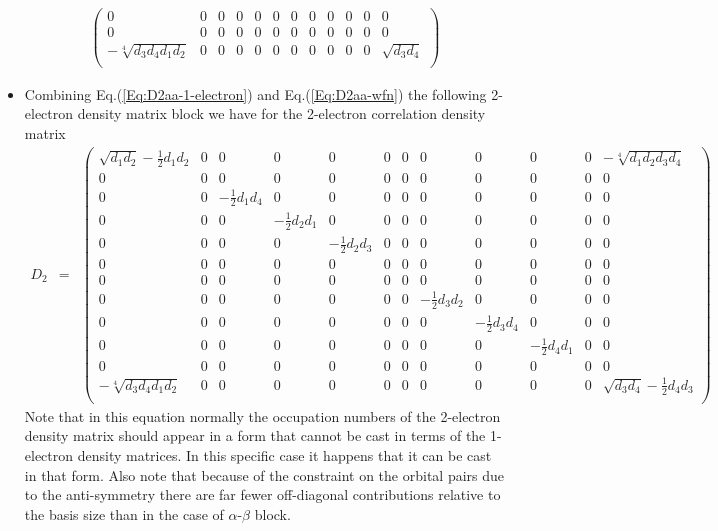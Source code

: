 \documentclass{amsart}
\begin{document}
\begin{itemize}
\begin{eqnarray}
\begin{pmatrix}
         0 & 0 & 0 & 0 & 0 & 0 & 0 & 0 & 0 & 0 & 0 & 0 \\
         0 & 0 & 0 & 0 & 0 & 0 & 0 & 0 & 0 & 0 & 0 & 0 \\
         -\sqrt[4]{d_{3}d_{4}d_{1}d_{2}} & 0 & 0 & 0 & 0 & 0 & 0 & 0 & 0 & 0 & 0 & \sqrt{d_{3}d_{4}} \\
         \end{pmatrix} 
         \end{eqnarray}
\item Combining Eq.(\ref{Eq:D2aa-1-electron}) and Eq.(\ref{Eq:D2aa-wfn}) the following 2-electron
         density matrix block we have for the 2-electron correlation density matrix
         \tiny
         \begin{eqnarray}
         \label{Eq:D2aa-correlation}
         D_2 &=&
         \begin{pmatrix}
         \sqrt{d_{1}d_{2}}-\frac{1}{2}d_1 d_2 & 0 & 0 & 0 & 0 & 0 & 0 & 0 & 0 & 0 & 0 & -\sqrt[4]{d_{1}d_{2}d_{3}d_{4}} \\
         0 & 0 & 0 & 0 & 0 & 0 & 0 & 0 & 0 & 0 & 0 & 0 \\
         0 & 0 & -\frac{1}{2}d_1 d_4 & 0 & 0 & 0 & 0 & 0 & 0 & 0 & 0 & 0 \\
         0 & 0 & 0 & -\frac{1}{2}d_2 d_1 & 0 & 0 & 0 & 0 & 0 & 0 & 0 & 0 \\
         0 & 0 & 0 & 0 & -\frac{1}{2}d_2 d_3 & 0 & 0 & 0 & 0 & 0 & 0 & 0 \\
         0 & 0 & 0 & 0 & 0 & 0 & 0 & 0 & 0 & 0 & 0 & 0 \\
         0 & 0 & 0 & 0 & 0 & 0 & 0 & 0 & 0 & 0 & 0 & 0 \\
         0 & 0 & 0 & 0 & 0 & 0 & 0 & -\frac{1}{2}d_3 d_2 & 0 & 0 & 0 & 0 \\
         0 & 0 & 0 & 0 & 0 & 0 & 0 & 0 & -\frac{1}{2}d_3 d_4 & 0 & 0 & 0  \\
         0 & 0 & 0 & 0 & 0 & 0 & 0 & 0 & 0 & -\frac{1}{2}d_4 d_1 & 0 & 0  \\
         0 & 0 & 0 & 0 & 0 & 0 & 0 & 0 & 0 & 0 & 0 & 0  \\
         -\sqrt[4]{d_{3}d_{4}d_{1}d_{2}} & 0 & 0 & 0 & 0 & 0 & 0 & 0 & 0 & 0 & 0 & \sqrt{d_{3}d_{4}}-\frac{1}{2}d_4 d_3  \\
         \end{pmatrix}
         \end{eqnarray}
         \normalsize
         Note that in this equation normally the occupation numbers of the 2-electron density matrix should appear
         in a form that cannot be cast in terms of the 1-electron density matrices. In this specific case it happens that
         it can be cast in that form. Also note that because of the constraint on the orbital pairs due to the
         anti-symmetry there are far fewer off-diagonal contributions relative to the basis size than in the case of
         $\alpha$-$\beta$ block.
\end{itemize}
\end{document}
